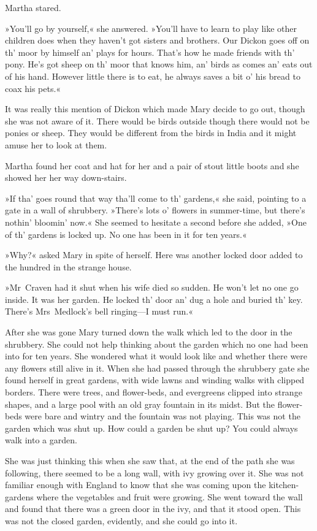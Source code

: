 Martha stared.

»You'll go by yourself,« she answered. »You'll have to learn to play like other children does when they haven't got sisters and brothers. Our Dickon goes off on th' moor by himself an' plays for hours. That's how he made friends with th' pony. He's got sheep on th' moor that knows him, an' birds as comes an' eats out of his hand. However little there is to eat, he always saves a bit o' his bread to coax his pets.«

It was really this mention of Dickon which made Mary decide to go out, though she was not aware of it. There would be birds outside though there would not be ponies or sheep. They would be different from the birds in India and it might amuse her to look at them.

Martha found her coat and hat for her and a pair of stout little boots and she showed her her way down-stairs.

»If tha' goes round that way tha'll come to th' gardens,« she said, pointing to a gate in a wall of shrubbery. »There's lots o' flowers in summer-time, but there's nothin' bloomin' now.« She seemed to hesitate a second before she added, »One of th' gardens is locked up. No one has been in it for ten years.«

»Why?« asked Mary in spite of herself. Here was another locked door added to the hundred in the strange house.

»Mr~Craven had it shut when his wife died so sudden. He won't let no one go inside. It was her garden. He locked th' door an' dug a hole and buried th' key. There's Mrs~Medlock's bell ringing—I must run.«

After she was gone Mary turned down the walk which led to the door in the shrubbery. She could not help thinking about the garden which no one had been into for ten years. She wondered what it would look like and whether there were any flowers still alive in it. When she had passed through the shrubbery gate she found herself in great gardens, with wide lawns and winding walks with clipped borders. There were trees, and flower-beds, and evergreens clipped into strange shapes, and a large pool with an old gray fountain in its midst. But the flower-beds were bare and wintry and the fountain was not playing. This was not the garden which was shut up. How could a garden be shut up? You could always walk into a garden.

She was just thinking this when she saw that, at the end of the path she was following, there seemed to be a long wall, with ivy growing over it. She was not familiar enough with England to know that she was coming upon the kitchen-gardens where the vegetables and fruit were growing. She went toward the wall and found that there was a green door in the ivy, and that it stood open. This was not the closed garden, evidently, and she could go into it.

